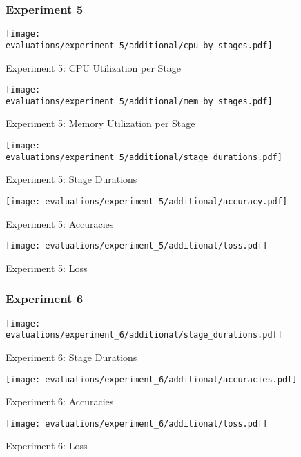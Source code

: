 \begin{figure}[p]
    \subsubsection{Experiment 5}

    \begin{adjustwidth}{-0.2\paperwidth}{-0.2\paperwidth}
        \centering
        \texttt{[image: evaluations/experiment\_5/additional/cpu\_by\_stages.pdf]}
        \caption{Experiment 5: CPU Utilization per Stage}
        \label{fig:eval_5_cpu_per_stage}
    \end{adjustwidth}

    \begin{adjustwidth}{-0.2\paperwidth}{-0.2\paperwidth}
        \centering
        \texttt{[image: evaluations/experiment\_5/additional/mem\_by\_stages.pdf]}
        \caption{Experiment 5: Memory Utilization per Stage}
        \label{fig:eval_5_memory_per_stage}
    \end{adjustwidth}
\end{figure}

\begin{figure}[p]
    \centering
    \begin{adjustwidth}{-0.2\paperwidth}{-0.2\paperwidth}
        \centering
        \texttt{[image: evaluations/experiment\_5/additional/stage\_durations.pdf]}
        \caption{Experiment 5: Stage Durations}
        \label{fig:eval_5_stage_durations}
    \end{adjustwidth}

    \texttt{[image: evaluations/experiment\_5/additional/accuracy.pdf]}
    \caption{Experiment 5: Accuracies}
    \label{fig:eval_5_accuracies}

    \texttt{[image: evaluations/experiment\_5/additional/loss.pdf]}
    \caption{Experiment 5: Loss}
    \label{fig:eval_5_loss}
\end{figure}

\pagebreak
\begin{figure}[p]

    \subsubsection{Experiment 6}

    \centering
    \begin{adjustwidth}{-0.2\paperwidth}{-0.2\paperwidth}
        \centering
        \texttt{[image: evaluations/experiment\_6/additional/stage\_durations.pdf]}
        \caption{Experiment 6: Stage Durations}
        \label{fig:eval_6_stage_durations}
    \end{adjustwidth}

    \texttt{[image: evaluations/experiment\_6/additional/accuracies.pdf]}
    \caption{Experiment 6: Accuracies}
    \label{fig:eval_6_accuracies}

    \texttt{[image: evaluations/experiment\_6/additional/loss.pdf]}
    \caption{Experiment 6: Loss}
    \label{fig:eval_6_loss}
\end{figure}

